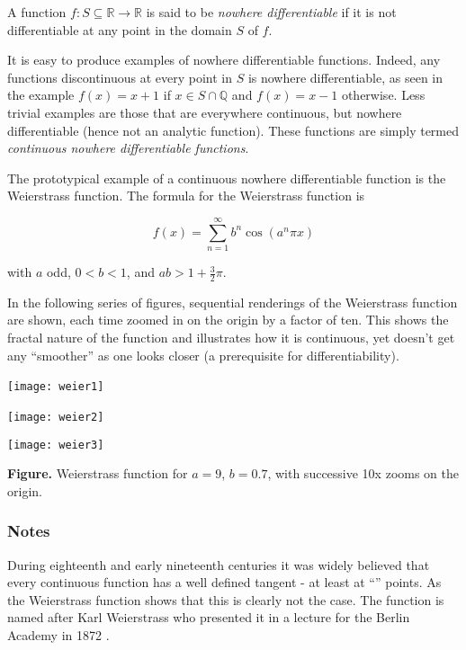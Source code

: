 \documentclass{article}
\begin{document}
A function $f:S\subseteq \mathbb{R}\to \mathbb{R}$ is said to be \emph{nowhere differentiable} if it is not differentiable at any point in the domain $S$ of $f$.

It is easy to produce examples of nowhere differentiable functions.  Indeed, any functions discontinuous at every point in $S$ is nowhere differentiable, as seen in the example $f(x)=x+1$ if $x\in S\cap \mathbb{Q}$ and $f(x)=x-1$ otherwise.  Less trivial examples are those that are everywhere continuous, but nowhere differentiable (hence not an analytic function).  These functions are simply termed \emph{continuous nowhere differentiable functions}.

The prototypical example of a continuous nowhere differentiable function is the Weierstrass function.  The formula for the Weierstrass function is

$$ f(x) = \sum_{n=1}^\infty b^n \cos(a^n \pi x) $$

with $a$ odd, $0 < b < 1$, and $ab > 1 + \frac{3}{2}\pi$.  

In the following series of figures, sequential renderings of the Weierstrass function are shown, each time zoomed in on the origin by a factor of ten. This shows the fractal nature of the function and illustrates how it is continuous, yet doesn't get any ``smoother'' as one looks closer (a prerequisite for differentiability).

\begin{center}
\texttt{[image: weier1]}\ \smallskip

\texttt{[image: weier2]}\ \smallskip

\texttt{[image: weier3]}\smallskip

\textbf{Figure.} Weierstrass function for $a=9$, $b=0.7$, with successive 10x zooms on the origin.
\end{center}

\subsubsection*{Notes}
During eighteenth and early nineteenth centuries it was 
widely believed that every continuous function has a well defined
tangent - at least at ``'' points. 
As the Weierstrass function shows that this is clearly not the case. 
The function is named after Karl Weierstrass who presented it 
in a lecture for the Berlin Academy in 1872 \cite{stewart}. 
\end{document}
